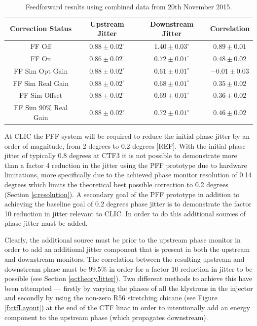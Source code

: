\begin{table}
  \begin{center}
    \begin{tabular}{| c | c | c | c |}
	   \hline
       Correction Status & Upstream Jitter & Downstream Jitter & Correlation \\ \hline
       FF Off & \(0.88\pm0.02^\circ\) & \(1.40\pm0.03^\circ\) & \(0.89\pm0.01\) \\
	   FF On & \(0.86\pm0.02^\circ\) & \(0.72\pm0.01^\circ\) & \(0.48\pm0.02\) \\
	   FF Sim Opt Gain & \(0.88\pm0.02^\circ\) & \(0.61\pm0.01^\circ\) & \(-0.01\pm0.03\) \\
	   FF Sim Real Gain & \(0.88\pm0.02^\circ\) & \(0.68\pm0.01^\circ\) & \(0.35\pm0.02\) \\
	   FF Sim Offset & \(0.88\pm0.02^\circ\) & \(0.69\pm0.01^\circ\) & \(0.36\pm0.02\) \\
	   FF Sim 90\% Real Gain & \(0.88\pm0.02^\circ\) & \(0.72\pm0.01^\circ\) & \(0.46\pm0.02\) \\ \hline
    \end{tabular}
    \caption{Feedforward results using combined data from 20th November 2015.}
  	\label{t:LongFF}
  \end{center}
\end{table}




At CLIC the PFF system will be required to reduce the initial phase jitter by an order of magnitude, from 2 degrees to 0.2 degrees [REF]. With the initial phase jitter of typically 0.8 degrees at CTF3 it is not possible to demonstrate more than a factor 4 reduction in the jitter using the PFF prototype due to hardware limitations, more specifically due to the achieved phase monitor resolution of 0.14 degrees which limits the theoretical best possible correction to 0.2 degrees (Section \ref{s:resolution}). A secondary goal of the PFF prototype in addition to achieving the baseline goal of 0.2 degrees phase jitter is to demonstrate the factor 10 reduction in jitter relevant to CLIC. In order to do this additional sources of phase jitter must be added.

Clearly, the additional source must be prior to the upstream phase monitor in order to add an additional jitter component that is present in both the upstream and downstream monitors. The correlation between the resulting upstream and downstream phase must be  \(99.5\%\) in order for a factor 10 reduction in jitter to be possible (see Section \ref{ss:theoryJitter}). Two different methods to achieve this have been attempted --- firstly by varying the phases of all the klystrons in the injector and secondly by using the non-zero R56 stretching chicane (see Figure \ref{f:ctfLayout}) at the end of the CTF linac in order to intentionally add an energy component to the upstream phase (which propagates downstream).

